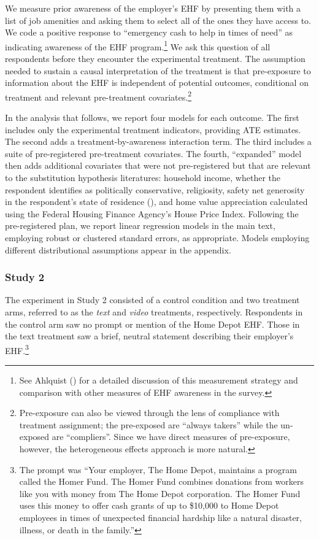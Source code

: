 \documentclass[
  11pt,
  oneside]{article}
\begin{document}
We measure prior awareness of the employer's EHF by presenting them with a list of job amenities and asking them to select all of the ones they have access to. We code a positive response to ``emergency cash to help in times of need'' as indicating awareness of the EHF program.\footnote{See Ahlquist () for a detailed discussion of this measurement strategy and comparison with other measures of EHF awareness in the survey.} We ask this question of all respondents before they encounter the experimental treatment. The assumption needed to sustain a causal interpretation of the treatment is that pre-exposure to information about the EHF is independent of potential outcomes, conditional on treatment and relevant pre-treatment covariates.\footnote{Pre-exposure can also be viewed through the lens of compliance with treatment assignment; the pre-exposed are ``always takers'' while the un-exposed are ``compliers''. Since we have direct measures of pre-exposure, however, the heterogeneous effects approach is more natural.}

In the analysis that follows, we report four models for each outcome. The first includes only the experimental treatment indicators, providing ATE estimates. The second adds a treatment-by-awareness interaction term. The third includes a suite of pre-registered pre-treatment covariates. The fourth, ``expanded'' model then adds additional covariates that were not pre-registered but that are relevant to the substitution hypothesis literatures: household income, whether the respondent identifies as politically conservative, religiosity, safety net generosity in the respondent's state of residence (), and home value appreciation calculated using the Federal Housing Finance Agency's House Price Index. Following the pre-registered plan, we report linear regression models in the main text, employing robust or clustered standard errors, as appropriate. Models employing different distributional assumptions appear in the appendix.

\subsubsection{Study 2}\label{study-2}

The experiment in Study 2 consisted of a control condition and two treatment arms, referred to as the \emph{text} and \emph{video} treatments, respectively. Respondents in the control arm saw no prompt or mention of the Home Depot EHF. Those in the text treatment saw a brief, neutral statement describing their employer's EHF.\footnote{The prompt was ``Your employer, The Home Depot, maintains a program called the Homer Fund. The Homer Fund combines donations from workers like you with money from The Home Depot corporation. The Homer Fund uses this money to offer cash grants of up to \$10,000 to Home Depot employees in times of unexpected financial hardship like a natural disaster, illness, or death in the family.''}
\end{document}
